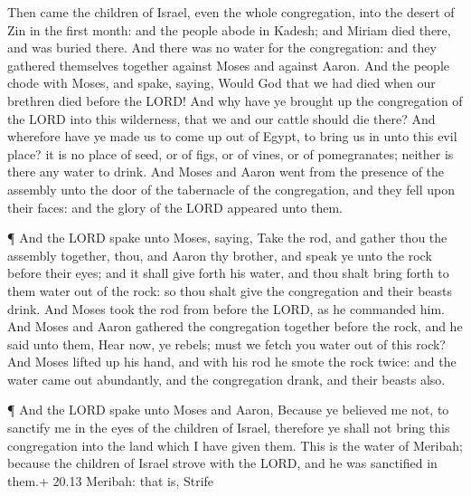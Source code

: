  Then came the children of Israel, even the whole
congregation, into the desert of Zin in the first month: and the people
abode in Kadesh; and Miriam died there, and was buried there.
 And there was no water for the congregation: and they
gathered themselves together against Moses and against Aaron.
 And the people chode with Moses, and spake, saying, Would
God that we had died when our brethren died before the LORD!
 And why have ye brought up the congregation of the LORD
into this wilderness, that we and our cattle should die there?
 And wherefore have ye made us to come up out of Egypt, to
bring us in unto this evil place? it is no place of seed, or of figs, or
of vines, or of pomegranates; neither is there any water to drink.
 And Moses and Aaron went from the presence of the assembly
unto the door of the tabernacle of the congregation, and they fell upon
their faces: and the glory of the LORD appeared unto them.

 ¶ And the LORD spake unto Moses, saying,  Take
the rod, and gather thou the assembly together, thou, and Aaron thy
brother, and speak ye unto the rock before their eyes; and it shall give
forth his water, and thou shalt bring forth to them water out of the
rock: so thou shalt give the congregation and their beasts drink.
 And Moses took the rod from before the LORD, as he
commanded him.  And Moses and Aaron gathered the
congregation together before the rock, and he said unto them, Hear now,
ye rebels; must we fetch you water out of this rock?  And
Moses lifted up his hand, and with his rod he smote the rock twice: and
the water came out abundantly, and the congregation drank, and their
beasts also.

 ¶ And the LORD spake unto Moses and Aaron, Because ye
believed me not, to sanctify me in the eyes of the children of Israel,
therefore ye shall not bring this congregation into the land which I
have given them.  This is the water of Meribah; because the
children of Israel strove with the LORD, and he was sanctified in them.+
20.13 Meribah: that is, Strife

